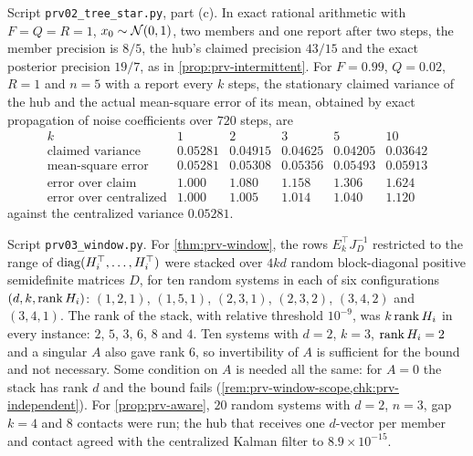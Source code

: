 \begin{numcheck}\label{chk:prv-intermittent}
Script \texttt{prv02\_tree\_star.py}, part (c). In exact rational arithmetic with $F=Q=R=1$, $x_0\sim\mathcal{N}(0,1)$, two members and one report after two steps, the member precision is $8/5$, the hub's claimed precision $43/15$ and the exact posterior precision $19/7$, as in \cref{prop:prv-intermittent}. For $F=0.99$, $Q=0.02$, $R=1$ and $n=5$ with a report every $k$ steps, the stationary claimed variance of the hub and the actual mean-square error of its mean, obtained by exact propagation of noise coefficients over $720$ steps, are
\[
\begin{array}{c|ccccc}
k & 1 & 2 & 3 & 5 & 10\\\hline
\text{claimed variance} & 0.05281 & 0.04915 & 0.04625 & 0.04205 & 0.03642\\
\text{mean-square error} & 0.05281 & 0.05308 & 0.05356 & 0.05493 & 0.05913\\
\text{error over claim} & 1.000 & 1.080 & 1.158 & 1.306 & 1.624\\
\text{error over centralized} & 1.000 & 1.005 & 1.014 & 1.040 & 1.120
\end{array}
\]
against the centralized variance $0.05281$.
\end{numcheck}

\begin{numcheck}\label{chk:prv-window}
Script \texttt{prv03\_window.py}. For \cref{thm:prv-window}, the rows $E_k^\top J_D^{-1}$ restricted to the range of $\operatorname{diag}(H_i^\top,\dots,H_i^\top)$ were stacked over $4kd$ random block-diagonal positive semidefinite matrices $D$, for ten random systems in each of six configurations $(d,k,\operatorname{rank} H_i)$: $(1,2,1)$, $(1,5,1)$, $(2,3,1)$, $(2,3,2)$, $(3,4,2)$ and $(3,4,1)$. The rank of the stack, with relative threshold $10^{-9}$, was $k\operatorname{rank} H_i$ in every instance: $2$, $5$, $3$, $6$, $8$ and $4$. Ten systems with $d=2$, $k=3$, $\operatorname{rank} H_i=2$ and a singular $A$ also gave rank $6$, so invertibility of $A$ is sufficient for the bound and not necessary. Some condition on $A$ is needed all the same: for $A=0$ the stack has rank $d$ and the bound fails (\cref{rem:prv-window-scope,chk:prv-independent}). For \cref{prop:prv-aware}, $20$ random systems with $d=2$, $n=3$, gap $k=4$ and $8$ contacts were run; the hub that receives one $d$-vector per member and contact agreed with the centralized Kalman filter to $8.9\times10^{-15}$.
\end{numcheck}

